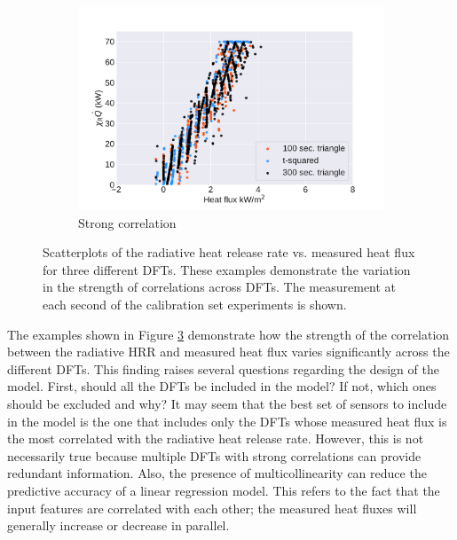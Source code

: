 \documentclass{article}
\begin{document}
\begin{figure}[htbp]
\begin{subfigure}[t]{.45\textwidth}
      \label{fig:moderate_scatter}
  \end{subfigure}
   \begin{subfigure}[t]{.45\textwidth}
      \centering
      \includegraphics[width=\textwidth ,keepaspectratio]{figures/strong_dft_scatter.pdf}
      \caption{Strong correlation}
      \label{fig:strong_scatter}
  \end{subfigure}
  \caption{Scatterplots of the radiative heat release rate vs. measured heat flux for three different DFTs. These examples demonstrate the variation in the strength of correlations across DFTs. The measurement at each second of the calibration set experiments is shown.} 
  \label{fig:dft_scatterplot}
\end{figure}

The examples shown in Figure \ref{fig:dft_scatterplot} demonstrate how the strength of the correlation between the radiative HRR and measured heat flux varies significantly across the different DFTs. This finding raises several questions regarding the design of the model. First, should all the DFTs be included in the model? If not, which ones should be excluded and why? It may seem that the best set of sensors to include in the model is the one that includes only the DFTs whose measured heat flux is the most correlated with the radiative heat release rate. However, this is not necessarily true because multiple DFTs with strong correlations can provide redundant information. Also, the presence of multicollinearity can reduce the predictive accuracy of a linear regression model. This refers to the fact that the input features are correlated with each other; the measured heat fluxes will generally increase or decrease in parallel. 
\end{document}
